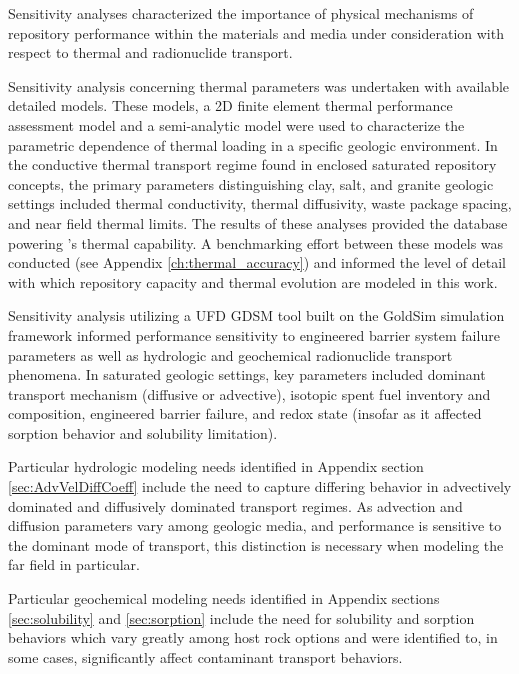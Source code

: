 Sensitivity analyses characterized the importance of physical mechanisms of 
repository performance  within the materials and media under consideration with 
respect to thermal and radionuclide transport.

Sensitivity analysis concerning thermal parameters was undertaken with available 
detailed models. These models, a 2D finite element thermal performance 
assessment model \cite{huff_benchmarking_2012, huff_numerical_2012} and a 
semi-analytic model \cite{greenberg_application_2012} were used to characterize 
the parametric dependence of thermal loading in a specific geologic environment.  
In the conductive thermal transport regime found in enclosed saturated 
repository concepts, the primary parameters distinguishing clay, salt, and 
granite geologic settings included thermal conductivity, thermal diffusivity, 
waste package spacing, and near field thermal limits. The results of these 
analyses provided the database powering \Cyder's thermal capability. A 
benchmarking effort between these models was conducted (see Appendix 
\ref{ch:thermal_accuracy}) and informed the level of detail with which 
repository capacity and thermal evolution are modeled in this work.  

Sensitivity analysis utilizing a \gls{UFD} \gls{GDSM} tool built on the 
GoldSim simulation framework informed performance sensitivity to engineered 
barrier system failure parameters as well as hydrologic and geochemical 
radionuclide transport phenomena. In saturated geologic settings, key parameters 
included dominant transport mechanism (diffusive or 
advective), isotopic spent fuel inventory and composition, engineered barrier 
failure, and redox state (insofar as it affected sorption behavior and 
solubility limitation).

Particular hydrologic modeling needs identified in Appendix section 
\ref{sec:AdvVelDiffCoeff} include the need to capture 
differing behavior in advectively dominated and diffusively dominated transport 
regimes. As advection and diffusion parameters vary among geologic media, and 
performance is sensitive to the dominant mode of transport, this distinction is 
necessary when modeling the far field in particular.

Particular geochemical modeling needs identified in Appendix sections 
\ref{sec:solubility} and \ref{sec:sorption} include the need for solubility and 
sorption behaviors which vary greatly among host rock options and were 
identified to, in some cases, significantly affect contaminant transport 
behaviors. 

